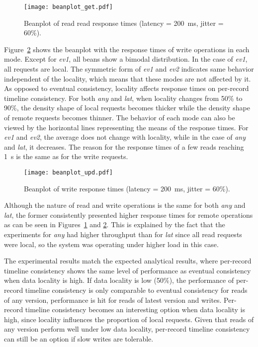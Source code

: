 \documentclass[man,floatsintext,12pt]{apa6}
\begin{document}
\begin{figure}[h!]
\caption{Beanplot of read read response times (latency = 200~ms, jitter = 60\%).}
\texttt{[image: beanplot\_get.pdf]}
\label{fig:beanplot_get}
\end{figure}

Figure~\ref{fig:beanplot_upd} shows the beanplot with the response times of
write operations in each mode. Except for \textit{ev1}, all beans show a
bimodal distribution. In the case of \textit{ev1}, all requests are local. The
symmetric form of \textit{ev1} and \textit{ev2} indicates same behavior
independent of the locality, which means that these modes are not affected by
it. As opposed to eventual consistency, locality affects response times on
per-record timeline consistency. For both \textit{any} and \textit{lat}, when
locality changes from 50\% to 90\%, the density shape of local requests becomes
thicker while the density shape of remote requests becomes thinner. The
behavior of each mode can also be viewed by the horizontal lines representing
the means of the response times. For \textit{ev1} and \textit{ev2}, the average
does not change with locality, while in the case of \textit{any} and
\textit{lat}, it decreases. The reason for the response times of a few reads 
reaching 1~s is the same as for the write requests.

\begin{figure}[h!]
\caption{Beanplot of write response times (latency = 200~ms, jitter = 60\%).}
\texttt{[image: beanplot\_upd.pdf]}
\label{fig:beanplot_upd}
\end{figure}

Although the nature of read and write operations is the same for both
\textit{any} and \textit{lat}, the former consistently presented higher
response times for remote operations as can be seen in
Figures~\ref{fig:beanplot_get} and \ref{fig:beanplot_upd}. This is explained by
the fact that the experiments for \textit{any} had higher throughput than for
\textit{lat} since all read requests were local, so the system was operating
under higher load in this case.

The experimental results match the expected analytical results, where
per-record timeline consistency shows the same level of performance as eventual
consistency when data locality is high. If data locality
is low (50\%), the performance of per-record timeline consistency is only
comparable to eventual consistency for reads of any version, performance is hit
for reads of latest version and writes. Per-record timeline consistency
becomes an interesting option when data locality is high, since locality
influences the proportion of local requests. Given that reads of any version
perform well under low data locality, per-record timeline consistency can still
be an option if slow writes are tolerable.
\end{document}
